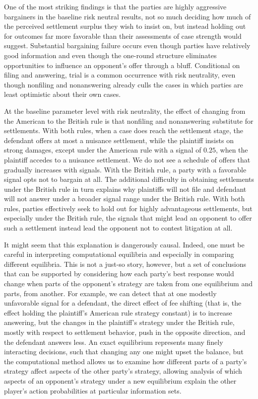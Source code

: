 \documentclass{article}
\begin{document}
One of the most striking findings is that the parties are highly aggressive bargainers in the baseline risk neutral results, not so much deciding how much of the perceived settlement surplus they wish to insist on, but instead holding out for outcomes far more favorable than their assessments of case strength would suggest. Substantial bargaining failure occurs even though parties have relatively good information and even though the one-round structure eliminates opportunities to influence an opponent's offer through a bluff. Conditional on filing and answering, trial is a common occurrence with risk neutrality, even though nonfiling and nonanswering already culls the cases in which parties are least optimistic about their own cases. 

At the baseline parameter level with risk neutrality, the effect of changing from the American to the British rule is that nonfiling and nonanswering substitute for settlements. With both rules, when a case does reach the settlement stage, the defendant offers at most a nuisance settlement, while the plaintiff insists on strong damages, except under the American rule with a signal of $0.25$, when the plaintiff accedes to a nuisance settlement. We do not see a schedule of offers that gradually increases with signals. With the British rule, a party with a favorable signal opts not to bargain at all. The additional difficulty in obtaining settlements under the British rule in turn explains why plaintiffs will not file and defendant will not answer under a broader signal range under the British rule. With both rules, parties effectively seek to hold out for highly advantageous settlements, but especially under the British rule, the signals that might lead an opponent to offer such a settlement instead lead the opponent not to contest litigation at all.

It might seem that this explanation is dangerously causal. Indeed, one must be careful in interpreting computational equilibria and especially in comparing different equilibria. This is not a just-so story, however, but a set of conclusions that can be supported by considering how each party's best response would change when parts of the opponent's strategy are taken from one equilibrium and parts, from another.  For example, we can detect that at one modestly unfavorable signal for a defendant, the direct effect of fee shifting (that is, the effect holding the plaintiff's American rule strategy constant) is to increase answering, but the changes in the plaintiff's strategy under the British rule, mostly with respect to settlement behavior, push in the opposite direction, and the defendant answers less. An exact equilibrium represents many finely interacting decisions, such that changing any one might upset the balance, but the computational method allows us to examine how different parts of a party's strategy affect aspects of the other party's strategy, allowing analysis of which aspects of an opponent's strategy under a new equilibrium explain the other player's action probabilities at particular information sets.
\end{document}
